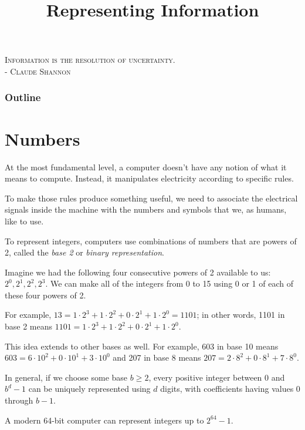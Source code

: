 \documentclass[8pt,a4paper,compress,handout]{beamer}
\title{Representing Information}
\date{}
\begin{document}
\begin{frame}
\begin{flushright}
\tiny \textsc{Information is the resolution of uncertainty. \\ - Claude Shannon}
\end{flushright}
\titlepage
\end{frame}

\begin{frame}
\frametitle{Outline}
\tableofcontents
\end{frame}

\section{Numbers}
\begin{frame}[fragile]
At the most fundamental level, a computer doesn't have any notion of what it means to compute. Instead, it manipulates electricity according to specific rules.

\bigskip

To make those rules produce something useful, we need to associate the electrical signals inside the machine with the numbers and symbols that we, as humans, like to use.
\end{frame}

\begin{frame}[fragile]
To represent integers, computers use combinations of numbers that are powers of 2, called the \emph{base 2} or \emph{binary representation}.

\bigskip

Imagine we had the following four consecutive powers of 2 available to us: $2^0, 2^1, 2^2, 2^3$. We can make all of the integers from 0 to 15 using 0 or 1 of each of these four powers of 2. 

\bigskip

For example, $13 = 1 \cdot 2^3 + 1 \cdot 2^2 + 0 \cdot 2^1 + 1 \cdot 2^0 = 1101$; in other words, 1101 in base 2 means $1101 = 1 \cdot 2^3 + 1 \cdot 2^2 + 0 \cdot 2^1 + 1 \cdot 2^0$.

\bigskip

This idea extends to other bases as well. For example, 603 in base 10 means $603 = 6 \cdot 10^2 + 0 \cdot 10^1 + 3 \cdot 10^0$ and 207 in base 8 means $207 = 2 \cdot 8^2 + 0 \cdot 8^1 + 7 \cdot 8^0$. 

\bigskip

In general, if we choose some base $b \geq 2$, every positive integer between 0 and $b^d-1$ can be uniquely represented using $d$ digits, with coefficients having values 0 through $b-1$.

\bigskip

A modern 64-bit computer can represent integers up to $2^{64} - 1$.
\end{frame}
\end{document}
